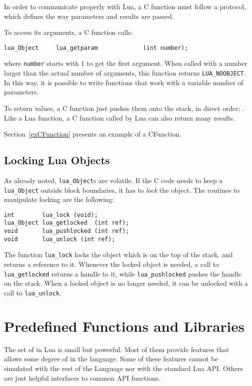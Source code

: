 In order to communicate properly with Lua,
a C function must follow a protocol,
which defines the way parameters and results are passed.

To access its arguments, a C function calls:
\begin{verbatim}
lua_Object     lua_getparam             (int number);
\end{verbatim}
where \verb'number' starts with 1 to get the first argument.
When called with a number larger than the actual number of arguments,
this function returns
\verb'LUA_NOOBJECT'.
In this way, it is possible to write functions that work with
a variable number of parameters.

To return values, a C function just pushes them onto the stack,
in direct order; .
Like a Lua function, a C function called by Lua can also return
many results.

Section~\ref{exCFunction} presents an example of a CFunction.


\subsection{Locking Lua Objects}

As already noted, \verb'lua_Object's are volatile.
If the C code needs to keep a \verb'lua_Object'
outside block boundaries,
it has to {\em lock} the object.
The routines to manipulate locking are the following:
\begin{verbatim}
int        lua_lock (void);
lua_Object lua_getlocked  (int ref);
void       lua_pushlocked (int ref);
void       lua_unlock (int ref);
\end{verbatim}
The function \verb'lua_lock' locks the object
which is on the top of the stack,
and returns a reference to it.
Whenever the locked object is needed,
a call to \verb'lua_getlocked'
returns a handle to it,
while \verb'lua_pushlocked' pushes the handle on the stack.
When a locked object is no longer needed,
it can be unlocked with a call to \verb'lua_unlock'.



\section{Predefined Functions and Libraries}

The set of  in Lua is small but powerful.
Most of them provide features that allows some degree of
 in the language.
Some of these features cannot be simulated with the rest of the
Language nor with the standard Lua API.
Others are just helpful interfaces to common API functions.

